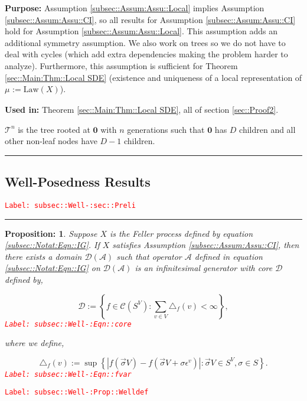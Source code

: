 \documentclass[12pt]{article}
\newcommand{\mc}{\mathcal}
\newcommand{\te}{\text}
\newcommand{\ep}{\epsilon}
\newcommand{\tr}{\textcolor{red}}
\newcommand{\labe}[1]{\tr{\texttt{Label: #1}}}
\newcommand{\purpose}{\textbf{Purpose: }}
\newcommand{\usein}{\textbf{Used in: }}
\newcommand{\ind}{\hspace{24pt}}
\newcommand{\lin}{\rule{\linewidth}{0.4 pt}}
\newcommand{\defeq}{:=}								%
\renewcommand{\root}{\mathbf{0}}				%
\renewcommand{\v}{v}							%
\renewcommand{\S}{S}							%
\newcommand{\s}{\sigma}							%
\newcommand{\sv}{\vec{\s}}						%
\newcommand{\ev}[1]{\ep^{#1}}					%
\newcommand{\X}{X}								%
\newcommand{\IG}{\mc{A}}						%
\newcommand{\degr}{D}								%
\newcommand{\law}{\te{Law}}							%
\newcommand{\tree}{\mc{T}}							%
\newcommand{\core}{\mc{D}}							%
\newcommand{\V}{V}									%
\newcommand{\numb}{n}								%
\newcommand{\XState}[1]{\S^{#1}}				%
\newcommand{\m}[3]{\mu_{#2#1}^{#3}}						%
\newcommand{\cont}{\mc{C}}							%
\newtheorem{prop}[thms]{Proposition: }
\begin{document}
\purpose Assumption \ref{subsec::Assum:Assu::Local} implies Assumption \ref{subsec::Assum:Assu::CI}, so all results for Assumption \ref{subsec::Assum:Assu::CI} hold for Assumption \ref{subsec::Assum:Assu::Local}. This assumption adds an additional symmetry assumption. We also work on trees so we do not have to deal with cycles (which add extra dependencies making the problem harder to analyze). Furthermore, this assumption is sufficient for Theorem \ref{sec::Main:Thm::Local SDE} (existence and uniqueness of a local representation of \(\m{}{}{} \defeq \law(\X{}{})\)).

\usein Theorem \ref{sec::Main:Thm::Local SDE}, all of section \ref{sec::Proof2}.

\ind \(\tree^\numb\) is the tree rooted at \(\root\) with \(\numb\) generations such that \(\root\) has \(\degr\) children and all other non-leaf nodes have \(\degr-1\) children.

\lin

\subsection{Well-Posedness Results}
\label{subsec::Well-:sec::Preli}\labe{subsec::Well-:sec::Preli}

\rule{\linewidth}{0.4 pt}

\begin{prop}
Suppose \(\X{}{}\) is the Feller process defined by equation \eqref{subsec::Notat:Eqn::IG}. If \(\X{}{}\) satisfies Assumption \ref{subsec::Assum:Assu::CI}, then there exists a domain \(\core(\IG)\) such that operator \(\IG\) defined in equation \eqref{subsec::Notat:Eqn::IG} on \(\mc{D}(\IG)\) is an infinitesimal generator with core \(\core\) defined by,

\begin{equation}
\core \defeq \left\{f \in \cont(\S^\V): \sum_{\v\in\V} \triangle_f(\v) < \infty\right\},
\label{subsec::Well-:Eqn::core}
\end{equation}
\labe{subsec::Well-:Eqn::core}

where we define,

\begin{equation}
\triangle_f(\v) \defeq \sup\left\{|f(\sv{}{\V}) - f(\sv{}{\V}+\s\ev{\v})|: \sv{}{\V} \in \S^\V,\s \in \S\right\}.
\label{subsec::Well-:Eqn::fvar}
\end{equation}
\labe{subsec::Well-:Eqn::fvar}

\label{subsec::Well-:Prop::Welldef}
\end{prop}
\labe{subsec::Well-:Prop::Welldef}
\end{document}
